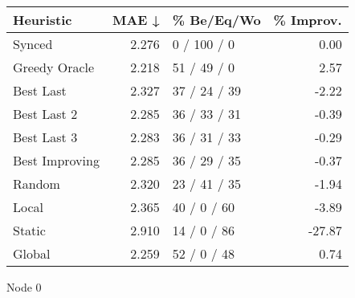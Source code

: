 \begin{tabular}{lrlr}
\toprule
\textbf{Heuristic} & \textbf{MAE ↓} & \textbf{\% Be/Eq/Wo} & \textbf{\% Improv.} \\
\midrule
            Synced &          2.276 &          0 / 100 / 0 &                0.00 \\
     Greedy Oracle &          2.218 &          51 / 49 / 0 &                2.57 \\
         Best Last &          2.327 &         37 / 24 / 39 &               -2.22 \\
       Best Last 2 &          2.285 &         36 / 33 / 31 &               -0.39 \\
       Best Last 3 &          2.283 &         36 / 31 / 33 &               -0.29 \\
    Best Improving &          2.285 &         36 / 29 / 35 &               -0.37 \\
            Random &          2.320 &         23 / 41 / 35 &               -1.94 \\
             Local &          2.365 &          40 / 0 / 60 &               -3.89 \\
            Static &          2.910 &          14 / 0 / 86 &              -27.87 \\
            Global &          2.259 &          52 / 0 / 48 &                0.74 \\
\bottomrule
\end{tabular}
\caption{Node 0}
\label{tab:hr_iid_lr05_le2_bs4_0}
